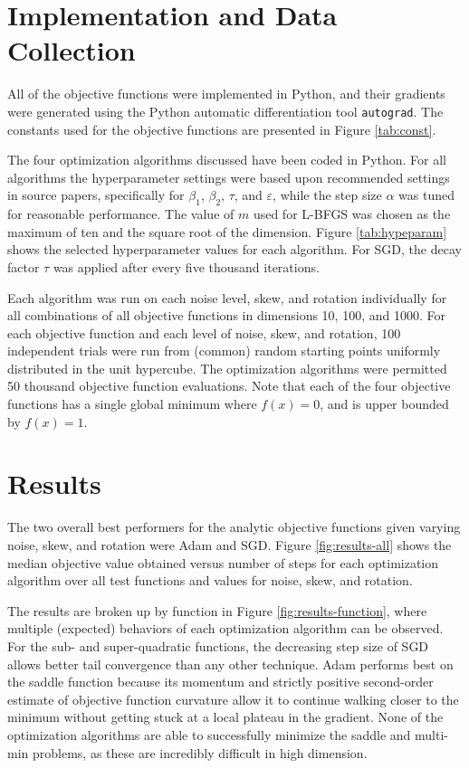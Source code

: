 \documentclass[conference]{ieeeconf}  %
\begin{document}
\section{Implementation and Data Collection}

All of the objective functions were implemented in Python, and their
gradients were generated using the Python automatic differentiation
tool {\tt autograd}.  The constants used for the objective functions
are presented in Figure \ref{tab:const}.

The four optimization algorithms discussed have been coded in Python.
For all algorithms the hyperparameter settings were based upon
recommended settings in source papers, specifically for $\beta_1$,
$\beta_2$, $\tau$, and $\varepsilon$, while the step size $\alpha$ was
tuned for reasonable performance. The value of $m$ used for L-BFGS
was chosen as the maximum of ten and the square root of the
dimension. Figure \ref{tab:hypeparam} shows the selected hyperparameter
values for each algorithm.  For SGD, the decay factor $\tau$ was
applied after every five thousand iterations.

Each algorithm was run on each noise level, skew, and rotation
individually for all combinations of all objective functions in
dimensions 10, 100, and 1000. For each objective function and each
level of noise, skew, and rotation, 100 independent trials were run
from (common) random starting points uniformly distributed in the unit
hypercube. The optimization algorithms were permitted 50 thousand
objective function evaluations. Note that each of the four objective
functions has a single global minimum where $f(x) = 0$, and is upper
bounded by $f(x) = 1$.

\section{Results}

The two overall best performers for the analytic objective functions
given varying noise, skew, and rotation were Adam and SGD.  Figure
\ref{fig:results-all} shows the median objective value obtained versus
number of steps for each optimization algorithm over all test
functions and values for noise, skew, and rotation.

The results are broken up by function in Figure
\ref{fig:results-function}, where multiple (expected) behaviors of
each optimization algorithm can be observed. For the sub- and
super-quadratic functions, the decreasing step size of SGD allows
better tail convergence than any other technique. Adam performs best
on the saddle function because its momentum and strictly positive
second-order estimate of objective function curvature allow it to
continue walking closer to the minimum without getting stuck at a
local plateau in the gradient. None of the optimization algorithms are
able to successfully minimize the saddle and multi-min problems, as
these are incredibly difficult in high dimension.
\end{document}
